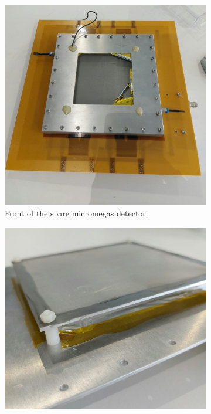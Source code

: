 \documentclass[sn-mathphys-num,iicol]{sn-jnl}
\theoremstyle{thmstyleone}
\theoremstyle{thmstyletwo}
\theoremstyle{thmstylethree}
\begin{document}
\begin{figure}[h]
  \centering
    \begin{subfigure}{0.47\textwidth}
        \includegraphics[width=\linewidth]{figures/micromegas_closed.jpeg}
        \caption{Front of the spare micromegas detector.}
        \label{fig:micromegas_closed}
    \end{subfigure}
    \begin{subfigure}{0.51\textwidth}
        \includegraphics[width=\linewidth]{figures/micromegas_cover.jpeg}

\end{subfigure}
\end{figure}
\end{document}
